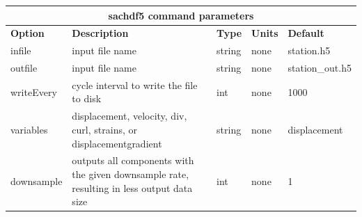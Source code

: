 \documentclass[11pt]{report}
\begin{document}
{\begin{center}
	\begin{tabular}{|l|p{8cm}|l|l|l|} \hline
		\multicolumn{5}{|c|}{\bf sachdf5 command parameters}                                                                                               \\ \hline
		\bf{Option} & \bf{Description}                                                                          & \bf{Type} & \bf{Units} & \bf{Default}    \\ \hline \hline
		infile      & input file name                                                                           & string    & none       & station.h5      \\ \hline
		outfile     & input file name                                                                           & string    & none       & station\_out.h5 \\ \hline
		writeEvery  & cycle interval to write the file to disk                                                  & int       & none       & 1000            \\ \hline
		\hline
		variables   & displacement, velocity, div, curl, strains, or displacementgradient                       & string    & none       & displacement    \\ \hline
		downsample  & outputs all components with the given downsample rate, resulting in less output data size & int       & none       & 1               \\ \hline
	\end{tabular}
\end{center}


}
\end{document}
